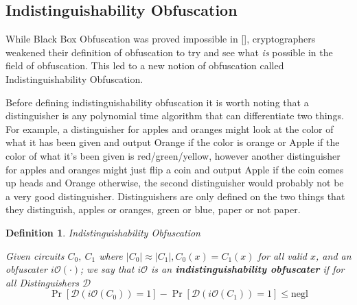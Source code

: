 \documentclass[12pt,twoside]{reedthesis}
\newtheorem{definition}{Definition}
\begin{document}
    \subsection{Indistinguishability Obfuscation}
    While Black Box Obfuscation was proved impossible in [\cite{vbb}], cryptographers weakened their definition of obfuscation to try and see what \textit{is} possible in the field of obfuscation. This led to a new notion of obfuscation called Indistinguishability Obfuscation. 
    \par Before defining indistinguishability obfuscation it is worth noting that a distinguisher is any polynomial time algorithm that can differentiate two things. For example, a distinguisher for apples and oranges might look at the color of what it has been given and output  Orange if the color is orange or Apple if the color of what it's been given is red/green/yellow, however another distinguisher for apples and oranges might just flip a coin and output Apple if the coin comes up heads and Orange otherwise, the second distinguisher would probably not be a very good distinguisher. Distinguishers are only defined on the two things that they distinguish, apples or oranges, green or blue, paper or not paper.
       \newcommand{\iO}[0]{\textit{i}\mathcal{O}}
    
    \pagebreak
    \begin{definition}{Indistinguishability Obfuscation}
    \par Given circuits $C_0,\ C_1$ where $|C_0| \approx |C_1|, C_0(x) = C_1(x)$ for all valid $x$, and an obfuscater $\iO(\cdot)$; we say that $\iO$ is an \textbf{indistinguishability obfuscater} if for all Distinguishers $\mathcal{D}$
    $$\Pr[\mathcal{D}(\iO(C_0)) = 1] -\Pr[\mathcal{D}(\iO(C_1)) = 1] \leq \text{negl}$$
    \end{definition}
    
\end{document}

